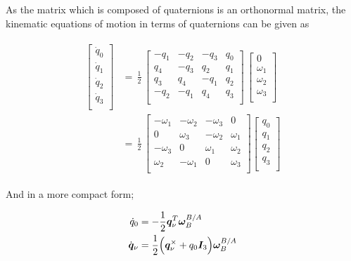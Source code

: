 As the matrix which is composed of quaternions is an orthonormal matrix, the kinematic equations of motion in terms of quaternions can be given as \cite{wie2008space}

\begin{align} \label{eqn:kinematicArrange}
\begin{split}
\begin{bmatrix}
\dot{q}_0\\[0.2em]
\dot{q}_1\\[0.2em]
\dot{q}_2\\[0.2em]
\dot{q}_3\\[0.2em]
\end{bmatrix}
& =\,
\frac{1}{2}
\,
\begin{bmatrix}
-q_1 & -q_2 & -q_3 & q_0 \\[0.2em]
q_4 & -q_3 & q_2 & q_1 \\[0.2em]
q_3 & q_4 & -q_1 & q_2 \\[0.2em]
-q_2 & -q_1 & q_4 & q_3 \\[0.2em]
\end{bmatrix}
\,
\begin{bmatrix}
0\\[0.2em]
\omega_1\\[0.2em]
\omega_2\\[0.2em]
\omega_3\\[0.2em]
\end{bmatrix} \\
& =\,
\frac{1}{2}
\,
\begin{bmatrix}
-\omega_1 & -\omega_2 & -\omega_3 & 0 \\[0.2em]
0 & \omega_3 & -\omega_2 & \omega_1 \\[0.2em]
-\omega_3 & 0 & \omega_1 & \omega_2 \\[0.2em]
\omega_2 & -\omega_1 & 0 & \omega_3 \\[0.2em]
\end{bmatrix}
\begin{bmatrix}
q_0\\[0.2em]
q_1\\[0.2em]
q_2\\[0.2em]
q_3\\[0.2em]
\end{bmatrix}
\end{split}
\end{align}

And in a more compact form;

\begin{align}{\label{eqn:compactKinematics}}
\begin{split}
\dot{q}_0 &= -\frac{1}{2} \bm{q}_\nu^T \bm{\omega}_B^{B/A}\\
\dot{\bm{q}}_\nu &= \frac{1}{2}\Big(\bm{q}_\nu^\times + q_0 \bm{I}_3 \Big) \bm{\omega}_B^{B/A} \\
\end{split}
\end{align}

